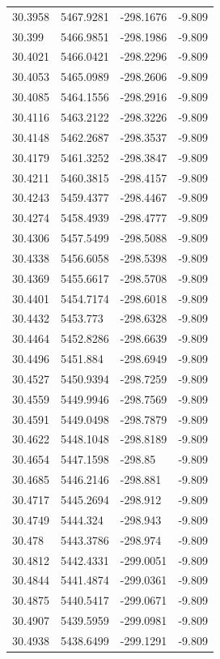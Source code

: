 \begin{table}[H]
\begin{tabular}{llll}
30.3958 & 5467.9281 & -298.1676 & -9.809 \\
30.399 & 5466.9851 & -298.1986 & -9.809 \\
30.4021 & 5466.0421 & -298.2296 & -9.809 \\
30.4053 & 5465.0989 & -298.2606 & -9.809 \\
30.4085 & 5464.1556 & -298.2916 & -9.809 \\
30.4116 & 5463.2122 & -298.3226 & -9.809 \\
30.4148 & 5462.2687 & -298.3537 & -9.809 \\
30.4179 & 5461.3252 & -298.3847 & -9.809 \\
30.4211 & 5460.3815 & -298.4157 & -9.809 \\
30.4243 & 5459.4377 & -298.4467 & -9.809 \\
30.4274 & 5458.4939 & -298.4777 & -9.809 \\
30.4306 & 5457.5499 & -298.5088 & -9.809 \\
30.4338 & 5456.6058 & -298.5398 & -9.809 \\
30.4369 & 5455.6617 & -298.5708 & -9.809 \\
30.4401 & 5454.7174 & -298.6018 & -9.809 \\
30.4432 & 5453.773 & -298.6328 & -9.809 \\
30.4464 & 5452.8286 & -298.6639 & -9.809 \\
30.4496 & 5451.884 & -298.6949 & -9.809 \\
30.4527 & 5450.9394 & -298.7259 & -9.809 \\
30.4559 & 5449.9946 & -298.7569 & -9.809 \\
30.4591 & 5449.0498 & -298.7879 & -9.809 \\
30.4622 & 5448.1048 & -298.8189 & -9.809 \\
30.4654 & 5447.1598 & -298.85 & -9.809 \\
30.4685 & 5446.2146 & -298.881 & -9.809 \\
30.4717 & 5445.2694 & -298.912 & -9.809 \\
30.4749 & 5444.324 & -298.943 & -9.809 \\
30.478 & 5443.3786 & -298.974 & -9.809 \\
30.4812 & 5442.4331 & -299.0051 & -9.809 \\
30.4844 & 5441.4874 & -299.0361 & -9.809 \\
30.4875 & 5440.5417 & -299.0671 & -9.809 \\
30.4907 & 5439.5959 & -299.0981 & -9.809 \\
30.4938 & 5438.6499 & -299.1291 & -9.809 \\

\end{tabular}
\end{table}
